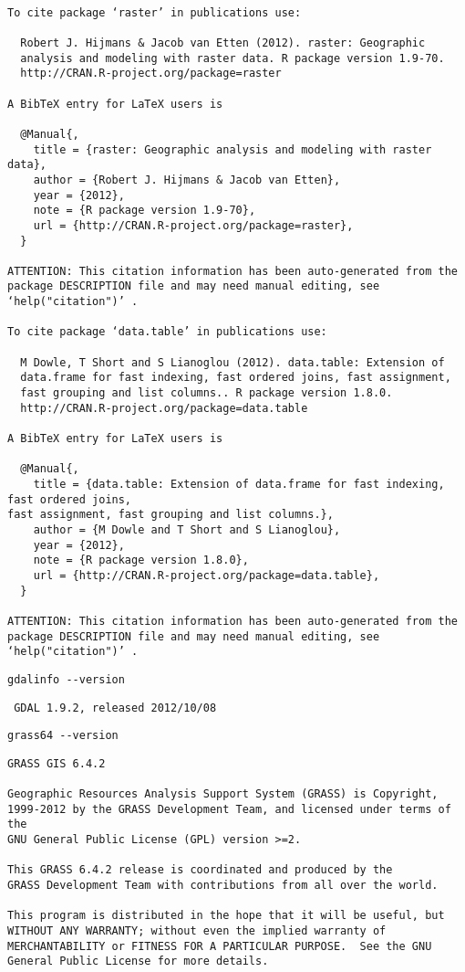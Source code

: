 \documentclass[11pt]{article}
\begin{document}
\begin{verbatim}

To cite package ‘raster’ in publications use:

  Robert J. Hijmans & Jacob van Etten (2012). raster: Geographic
  analysis and modeling with raster data. R package version 1.9-70.
  http://CRAN.R-project.org/package=raster

A BibTeX entry for LaTeX users is

  @Manual{,
    title = {raster: Geographic analysis and modeling with raster data},
    author = {Robert J. Hijmans & Jacob van Etten},
    year = {2012},
    note = {R package version 1.9-70},
    url = {http://CRAN.R-project.org/package=raster},
  }

ATTENTION: This citation information has been auto-generated from the
package DESCRIPTION file and may need manual editing, see
‘help("citation")’ .

To cite package ‘data.table’ in publications use:

  M Dowle, T Short and S Lianoglou (2012). data.table: Extension of
  data.frame for fast indexing, fast ordered joins, fast assignment,
  fast grouping and list columns.. R package version 1.8.0.
  http://CRAN.R-project.org/package=data.table

A BibTeX entry for LaTeX users is

  @Manual{,
    title = {data.table: Extension of data.frame for fast indexing, fast ordered joins,
fast assignment, fast grouping and list columns.},
    author = {M Dowle and T Short and S Lianoglou},
    year = {2012},
    note = {R package version 1.8.0},
    url = {http://CRAN.R-project.org/package=data.table},
  }

ATTENTION: This citation information has been auto-generated from the
package DESCRIPTION file and may need manual editing, see
‘help("citation")’ .
\end{verbatim}


\begin{verbatim}
gdalinfo --version
\end{verbatim}

\begin{verbatim}
 GDAL 1.9.2, released 2012/10/08
\end{verbatim}



\begin{verbatim}
grass64 --version
\end{verbatim}


\begin{verbatim}
GRASS GIS 6.4.2

Geographic Resources Analysis Support System (GRASS) is Copyright,
1999-2012 by the GRASS Development Team, and licensed under terms of the
GNU General Public License (GPL) version >=2.
 
This GRASS 6.4.2 release is coordinated and produced by the
GRASS Development Team with contributions from all over the world.

This program is distributed in the hope that it will be useful, but
WITHOUT ANY WARRANTY; without even the implied warranty of
MERCHANTABILITY or FITNESS FOR A PARTICULAR PURPOSE.  See the GNU
General Public License for more details.
\end{verbatim}
\end{document}
